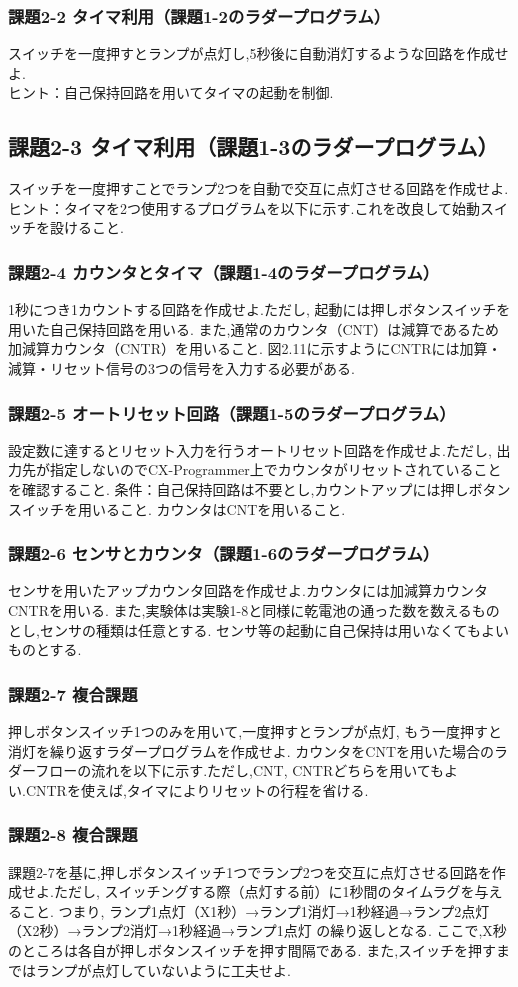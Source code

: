 \subsubsection*{課題2-2 タイマ利用（課題1-2のラダープログラム）}
スイッチを一度押すとランプが点灯し,5秒後に自動消灯するような回路を作成せよ.\\
ヒント：自己保持回路を用いてタイマの起動を制御.

\subsection*{課題2-3 タイマ利用（課題1-3のラダープログラム）}
スイッチを一度押すことでランプ2つを自動で交互に点灯させる回路を作成せよ.
ヒント：タイマを2つ使用するプログラムを以下に示す.これを改良して始動スイッチを設けること.

\subsubsection*{課題2-4 カウンタとタイマ（課題1-4のラダープログラム）}
1秒につき1カウントする回路を作成せよ.ただし,
起動には押しボタンスイッチを用いた自己保持回路を用いる.
また,通常のカウンタ（CNT）は減算であるため加減算カウンタ（CNTR）を用いること.
図2.11に示すようにCNTRには加算・減算・リセット信号の3つの信号を入力する必要がある.

\subsubsection*{課題2-5 オートリセット回路（課題1-5のラダープログラム）}
設定数に達するとリセット入力を行うオートリセット回路を作成せよ.ただし,
出力先が指定しないのでCX-Programmer上でカウンタがリセットされていることを確認すること.
条件：自己保持回路は不要とし,カウントアップには押しボタンスイッチを用いること.
カウンタはCNTを用いること.

\subsubsection*{課題2-6 センサとカウンタ（課題1-6のラダープログラム）}
センサを用いたアップカウンタ回路を作成せよ.カウンタには加減算カウンタCNTRを用いる.
また,実験体は実験1-8と同様に乾電池の通った数を数えるものとし,センサの種類は任意とする.
センサ等の起動に自己保持は用いなくてもよいものとする.

\subsubsection*{課題2-7 複合課題}
押しボタンスイッチ1つのみを用いて,一度押すとランプが点灯,
もう一度押すと消灯を繰り返すラダープログラムを作成せよ.
カウンタをCNTを用いた場合のラダーフローの流れを以下に示す.ただし,CNT,
CNTRどちらを用いてもよい.CNTRを使えば,タイマによりリセットの行程を省ける.

\subsubsection*{課題2-8 複合課題}
課題2-7を基に,押しボタンスイッチ1つでランプ2つを交互に点灯させる回路を作成せよ.ただし,
スイッチングする際（点灯する前）に1秒間のタイムラグを与えること.
つまり,
ランプ1点灯（X1秒）→ランプ1消灯→1秒経過→ランプ2点灯（X2秒）→ランプ2消灯→1秒経過→ランプ1点灯
の繰り返しとなる.
ここで,X秒のところは各自が押しボタンスイッチを押す間隔である.
また,スイッチを押すまではランプが点灯していないように工夫せよ.
